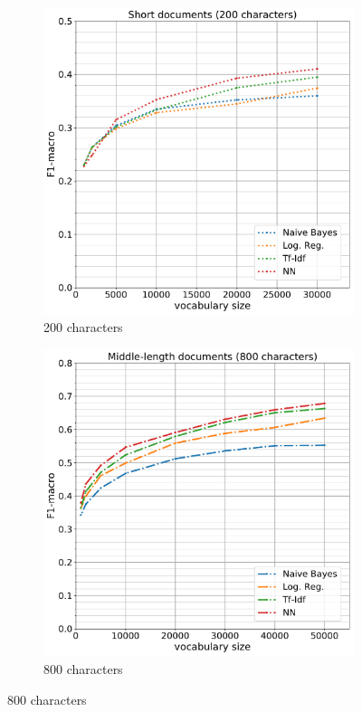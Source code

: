 \begin{figure}
\centering
\begin{subfigure}[t]{.49\textwidth}
	\centering
	\includegraphics[width=0.99\linewidth]{img/05_bow_200}
	\caption{200 characters}
	\label{fig:05_bow_200}
\end{subfigure}%
\begin{subfigure}[t]{.49\textwidth}
	\centering
	\includegraphics[width=0.99\linewidth]{img/05_bow_800}
	\caption{800 characters}
	\label{fig:05_bow_800}
\end{subfigure}


\end{figure}
